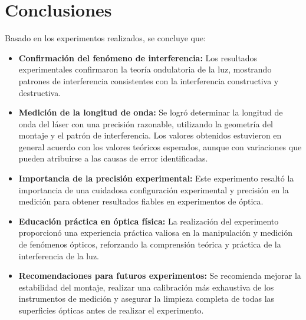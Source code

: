 \section{Conclusiones}
Basado en los experimentos realizados, se concluye que:
\begin{itemize}
    \item \textbf{Confirmación del fenómeno de interferencia:} Los resultados experimentales confirmaron la teoría ondulatoria de la luz, mostrando patrones de interferencia consistentes con la interferencia constructiva y destructiva.
    \item \textbf{Medición de la longitud de onda:} Se logró determinar la longitud de onda del láser con una precisión razonable, utilizando la geometría del montaje y el patrón de interferencia. Los valores obtenidos estuvieron en general acuerdo con los valores teóricos esperados, aunque con variaciones que pueden atribuirse a las causas de error identificadas.
    \item \textbf{Importancia de la precisión experimental:} Este experimento resaltó la importancia de una cuidadosa configuración experimental y precisión en la medición para obtener resultados fiables en experimentos de óptica.
    \item \textbf{Educación práctica en óptica física:} La realización del experimento proporcionó una experiencia práctica valiosa en la manipulación y medición de fenómenos ópticos, reforzando la comprensión teórica y práctica de la interferencia de la luz.
    \item \textbf{Recomendaciones para futuros experimentos:} Se recomienda mejorar la estabilidad del montaje, realizar una calibración más exhaustiva de los instrumentos de medición y asegurar la limpieza completa de todas las superficies ópticas antes de realizar el experimento.
\end{itemize}

